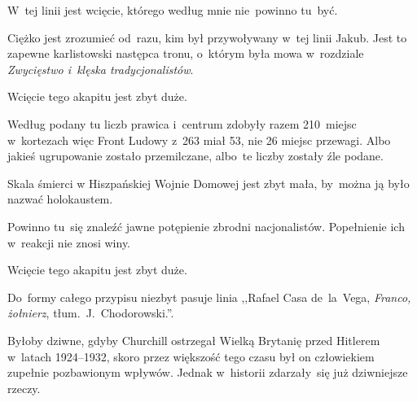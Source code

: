 \documentclass[a4paper,11pt]{article}
\begin{document}
\start {} W~tej linii jest wcięcie, którego według mnie
nie~powinno tu~być.

\vspace{\spaceFour}


\start {} Ciężko jest zrozumieć od~razu, kim był
przywoływany w~tej linii Jakub. Jest to zapewne karlistowski następca
tronu, o~którym była mowa w~rozdziale \emph{Zwycięstwo i~klęska
  tradycjonalistów}. 

\vspace{\spaceFour}


\start {} Wcięcie tego akapitu jest zbyt duże.

\vspace{\spaceFour}


\start {} Według podany tu liczb prawica i~centrum zdobyły
razem 210~miejsc w~kortezach więc Front Ludowy z~263 miał 53, nie 26
miejsc przewagi. Albo jakieś ugrupowanie zostało przemilczane, albo~te
liczby zostały źle podane.

\vspace{\spaceFour}


\start {} Skala śmierci w Hiszpańskiej Wojnie Domowej jest
zbyt mała, by~można ją było nazwać holokaustem.

\vspace{\spaceFour}


\start {} Powinno tu~się znaleźć jawne potępienie zbrodni
nacjonalistów. Popełnienie ich w~reakcji nie znosi winy.

\vspace{\spaceFour}


\start {} Wcięcie tego akapitu jest zbyt duże.

\vspace{\spaceFour}


\start {} Do~formy całego przypisu niezbyt pasuje linia
,,Rafael Casa de~la~Vega, \emph{Franco, żołnierz},
tłum.~J.~Chodorowski.''.

\vspace{\spaceFour}


\start {} Byłoby dziwne, gdyby Churchill ostrzegał Wielką
Brytanię przed Hitlerem w~latach 1924--1932, skoro przez większość
tego czasu był on człowiekiem zupełnie pozbawionym wpływów. Jednak
w~historii zdarzały~się już dziwniejsze rzeczy.

\vspace{\spaceFour}
\end{document}
